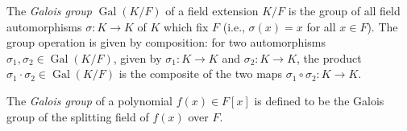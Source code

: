 \documentclass[12pt]{article}
\begin{document}
The \emph{Galois group} $\operatorname{Gal}(K/F)$ of a field extension $K/F$ is the group of all field automorphisms $\sigma\colon K \to K$ of $K$ which fix $F$ (i.e., $\sigma(x) = x$ for all $x \in F$). The group operation is given by composition: for two automorphisms $\sigma_1, \sigma_2 \in \operatorname{Gal}(K/F)$, given by $\sigma_1\colon K \to K$ and $\sigma_2\colon K \to K$, the product $\sigma_1 \cdot \sigma_2 \in \operatorname{Gal}(K/F)$ is the composite of the two maps $\sigma_1 \circ \sigma_2\colon K \to K$.

The \emph{Galois group} of a polynomial $f(x) \in F[x]$ is defined to be the Galois group of the splitting field of $f(x)$ over $F$.
\end{document}
